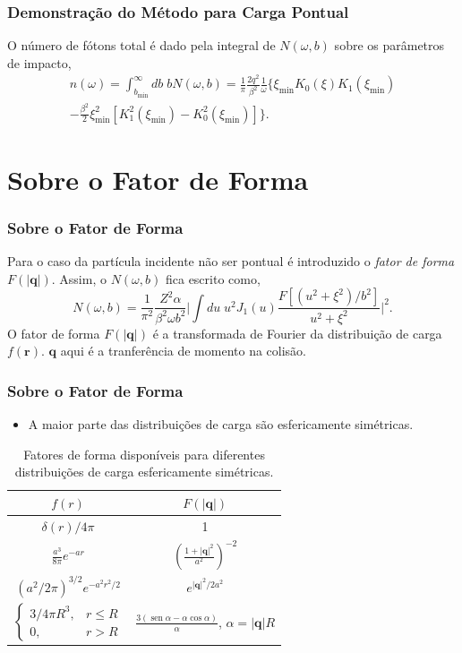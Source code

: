 \documentclass[xcolor=dvipsnames]{beamer}
\DeclareMathOperator*{\sen}{sen}
\renewcommand{\vec}{\mathbf}
\begin{document}
\begin{frame}
	\frametitle{Demonstração do Método para Carga Pontual}
	O número de fótons total é dado pela integral de $N(\omega , b)$ sobre os
	parâmetros de impacto,
	\begin{multline}
		n(\omega) = \int _{b_{\text{min}}}^\infty db\; bN(\omega , b)  
		= \frac{1}{\pi} \frac{2q^2}{\beta ^2} \frac{1}{\omega} \biggl\{ \xi
		_\text{min} K_0 \left( \xi \right) K_1 \left( \xi _\text{min} \right) 
		\\
		-\frac{\beta ^2}{2} \xi _\text{min} ^2 \left[ K_1 ^2 \left( \xi
		_\text{min} \right) - K_0 ^2 \left( \xi _\text{min} \right) \right]
		\biggr\}. \label{eq_EPT}
	\end{multline}
\end{frame}

\section{Sobre o Fator de Forma}
\begin{frame}
	\frametitle{Sobre o Fator de Forma}
	Para o caso da partícula incidente não ser pontual é introduzido o
	\textit{fator de forma} $F(|\vec{q}|)$. Assim, o $N(\omega , b)$ fica
	escrito como,
	\begin{equation}
		N(\omega , b) = \frac{1}{\pi ^2} \frac{Z^2 \alpha}{\beta ^2 \omega b^2}
		\Bigg| \int du \; u^2 J_1 (u) \frac{F[(u^2 + \xi ^2)/b^2]}{u^2 + \xi ^2}
		\Bigg|^2. \label{eq_EP-SPEC-F}
	\end{equation}
	O fator de forma $F(|\vec{q}|)$ é a transformada de Fourier da distribuição
	de carga $f(\vec{r})$. $\vec{q}$ aqui é a tranferência de momento na
	colisão.
\end{frame}

\begin{frame}
	\frametitle{Sobre o Fator de Forma}
	\begin{itemize}
		\item A maior parte das distribuições de carga são esfericamente
			simétricas.
	\end{itemize}
	\begin{table}
		\begin{tabular}{|c|c|}
			\hline 
			$f(r)$ & $F(|\vec{q}|)$ \\
			\hline
			 $\delta (r) / 4 \pi$ & 1 \\
			$\displaystyle \frac{a^3}{8\pi} e^{-ar}$ &
			$\displaystyle \left(\frac{1 + |\vec{q}|^2}{a^2}\right) ^{-2}$\\
			$ \left( a^2 / 2\pi \right)^{3/2} e
			^{-a^2 r^2 / 2}$ & $e^{|\vec{q}|^2 / 2a^2 }$ \\
			 $\displaystyle \begin{cases}
				3/4\pi R^3, & r \leq R \\
				0, & r > R
			\end{cases}$ & $ \displaystyle \frac{3(\sen \alpha - \alpha \cos
			\alpha)}{\alpha}$, $\alpha = |\vec{q}| R$ 
			\\
			\hline
		\end{tabular}
		\caption{Fatores de forma disponíveis para diferentes distribuições de
		carga esfericamente simétricas.}
	\end{table}
\end{frame}
\end{document}
